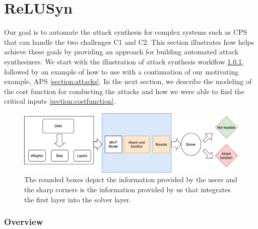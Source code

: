 	\chapter{ReLUSyn}

Our goal is to automate the attack synthesis for complex systems such as CPS that can handle the two challenges C1 and C2. This section illustrates how \tool helps achieve these goals by providing an approach for building automated attack synthesizers. We start with the illustration of attack synthesis workflow \ref{section:overview}, followed by an example of how to use \tool with a continuation of our motivating example, APS \ref{section:attacks}. In the next section, we describe the modeling of the cost function for conducting the attacks and how we were able to find the critical inputs \ref{section:costfunction}. %

\begin{figure}
	\centering
	\includegraphics[scale=0.1]{"Images/Methodology"}
	\caption[Methodology]{The rounded boxes depict the information provided by the users and the sharp corners is the information provided by us that integrates the first layer into the solver layer.}
	\label{fig:methodology-2}
\end{figure}



\subsection{Overview}
\label{section:overview}

